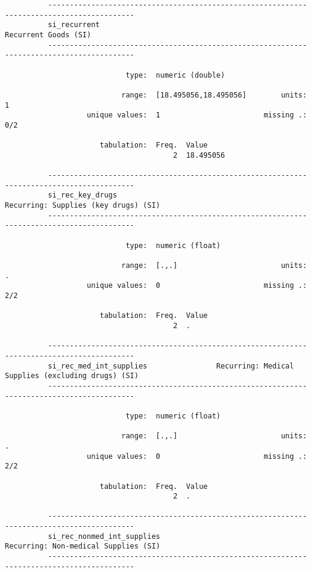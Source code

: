 \documentclass{article}
\begin{document}
\begin{verbatim}
          ------------------------------------------------------------------------------------------
          si_recurrent                                                          Recurrent Goods (SI)
          ------------------------------------------------------------------------------------------
          
                            type:  numeric (double)
          
                           range:  [18.495056,18.495056]        units:  1
                   unique values:  1                        missing .:  0/2
          
                      tabulation:  Freq.  Value
                                       2  18.495056
          
          ------------------------------------------------------------------------------------------
          si_rec_key_drugs                                      Recurring: Supplies (key drugs) (SI)
          ------------------------------------------------------------------------------------------
          
                            type:  numeric (float)
          
                           range:  [.,.]                        units:  .
                   unique values:  0                        missing .:  2/2
          
                      tabulation:  Freq.  Value
                                       2  .
          
          ------------------------------------------------------------------------------------------
          si_rec_med_int_supplies                Recurring: Medical Supplies (excluding drugs) (SI)
          ------------------------------------------------------------------------------------------
          
                            type:  numeric (float)
          
                           range:  [.,.]                        units:  .
                   unique values:  0                        missing .:  2/2
          
                      tabulation:  Freq.  Value
                                       2  .
          
          ------------------------------------------------------------------------------------------
          si_rec_nonmed_int_supplies                            Recurring: Non-medical Supplies (SI)
          ------------------------------------------------------------------------------------------
          

\end{verbatim}
\end{document}
